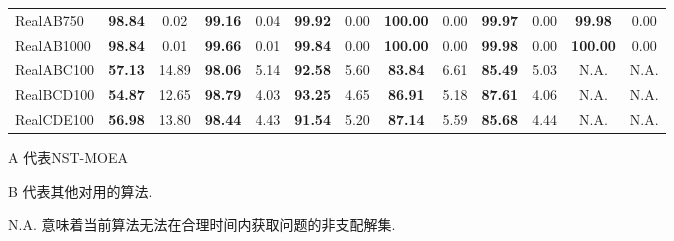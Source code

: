 \begin{table}[h]
\begin{threeparttable}
\begin{tabular}{lcccccccccccc}
            RealAB750                     & \textbf{98.84}                & 0.02                           & \textbf{99.16}                 & 0.04                     & \textbf{99.92}              & 0.00                      & \textbf{100.00}          & 0.00   & \textbf{99.97}  & 0.00   & \textbf{99.98}  & 0.00  \\
            RealAB1000                    & \textbf{98.84}                & 0.01                           & \textbf{99.66}                 & 0.01                     & \textbf{99.84}              & 0.00                      & \textbf{100.00}          & 0.00   & \textbf{99.98}  & 0.00   & \textbf{100.00} & 0.00  \\

            RealABC100                    & \textbf{57.13}                & 14.89                          & \textbf{98.06}                 & 5.14                     & \textbf{92.58}              & 5.60                      & \textbf{83.84}           & 6.61   & \textbf{85.49}  & 5.03   & N.A.            & N.A.  \\
            RealBCD100                    & \textbf{54.87}                & 12.65                          & \textbf{98.79}                 & 4.03                     & \textbf{93.25}              & 4.65                      & \textbf{86.91}           & 5.18   & \textbf{87.61}  & 4.06   & N.A.            & N.A.  \\
            RealCDE100                    & \textbf{56.98}                & 13.80                          & \textbf{98.44}                 & 4.43                     & \textbf{91.54}              & 5.20                      & \textbf{87.14}           & 5.59   & \textbf{85.68}  & 4.44   & N.A.            & N.A.  \\
            \bottomrule
        \end{tabular}
        \begin{tablenotes}
            \item[] A 代表NST-MOEA
            \item[] B 代表其他对用的算法.
            \item[] N.A. 意味着当前算法无法在合理时间内获取问题的非支配解集.
        \end{tablenotes}
    \end{threeparttable}
\end{table}
